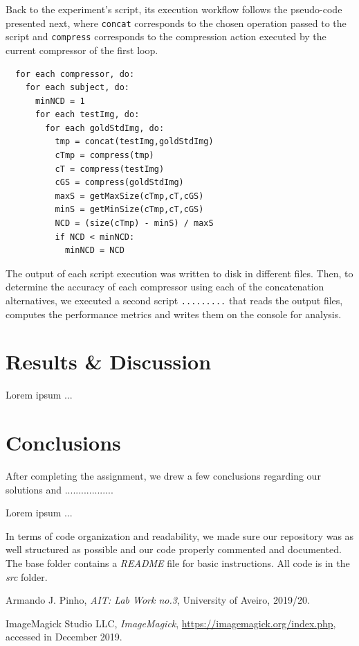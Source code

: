 \documentclass[12pt]{article}
\begin{document}
Back to the experiment's script, its execution workflow follows the pseudo-code presented next, where \texttt{concat} corresponds to the chosen operation passed 
to the script and \texttt{compress} corresponds to the compression action executed by the current compressor of the first loop.

\begin{verbatim}
  for each compressor, do:
    for each subject, do:
      minNCD = 1
      for each testImg, do:
        for each goldStdImg, do:
          tmp = concat(testImg,goldStdImg)
          cTmp = compress(tmp)
          cT = compress(testImg)
          cGS = compress(goldStdImg)
          maxS = getMaxSize(cTmp,cT,cGS)
          minS = getMinSize(cTmp,cT,cGS)
          NCD = (size(cTmp) - minS) / maxS
          if NCD < minNCD:
            minNCD = NCD
\end{verbatim}

\newpage
The output of each script execution was written to disk in different files.
Then, to determine the accuracy of each compressor using each of the concatenation alternatives, we executed a second script \texttt{.........} that reads the 
output files, computes the performance metrics and writes them on the console for analysis.

\section{Results \& Discussion} %

Lorem ipsum ...

\section{Conclusions} %

After completing the assignment, we drew a few conclusions regarding our 
solutions and ..................

Lorem ipsum ...

In terms of code organization and readability, we made sure our 
repository was as well structured as possible and our code properly commented
and documented.
The base folder contains a {\it README\/} file for basic instructions.
All code is in the {\it src\/} folder.

\newpage
\begin{thebibliography}{9} %
  

    Armando J. Pinho,
    \textit{AIT: Lab Work no.3},
    University of Aveiro,
    2019/20.
  
    ImageMagick Studio LLC,
    \textit{ImageMagick},
    \url{https://imagemagick.org/index.php},
    accessed in December 2019.
  
\end{thebibliography}

\clearpage
\end{document}
